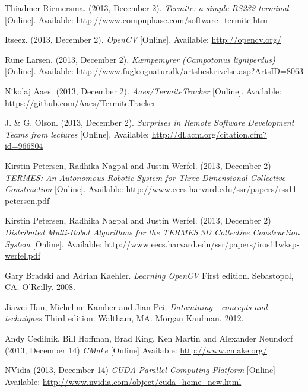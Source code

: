 \documentclass[oribibl]{llncs}
\begin{document}
\begin{thebibliography}{9}
    
		 Thiadmer Riemersma. (2013, December 2). \textit{Termite: a simple RS232 terminal} [Online]. Available: \url{http://www.compuphase.com/software_termite.htm}
        
         Itseez. (2013, December 2). \textit{OpenCV} [Online]. Available: \url{http://opencv.org/}
        
         Rune Larsen. (2013, December 2). \textit{Kæmpemyrer (Campotonus ligniperdus)} [Online]. Available: \url{http://www.fugleognatur.dk/artsbeskrivelse.asp?ArtsID=8063}
        
         Nikolaj Aaes. (2013, December 2). \textit{Aaes/TermiteTracker} [Online]. Available: \url{https://github.com/Aaes/TermiteTracker}
        
		 J. \& G. Olson. (2013, December 2). \textit{Surprises in Remote Software Development Teams from lectures} [Online]. Available: \url{http://dl.acm.org/citation.cfm?id=966804}
        
         Kirstin Petersen, Radhika Nagpal and Justin Werfel. (2013, December 2) \textit{TERMES: An Autonomous Robotic System for Three-Dimensional Collective Construction} [Online]. Available: \url{http://www.eecs.harvard.edu/ssr/papers/rss11-petersen.pdf}
        
         Kirstin Petersen, Radhika Nagpal and Justin Werfel. (2013, December 2) \textit{Distributed Multi-Robot Algorithms for the TERMES 3D Collective Construction System} [Online]. Available: \url{http://www.eecs.harvard.edu/ssr/papers/iros11wksp-werfel.pdf}
        
         Gary Bradski and Adrian Kaehler. \textit{Learning OpenCV} First edition. Sebastopol, CA. O'Reilly. 2008.
        
         Jiawei Han, Micheline Kamber and Jian Pei. \textit{Datamining - concepts and techniques} Third edition. Waltham, MA. Morgan Kaufman. 2012.
        
         Andy Cedilnik, Bill Hoffman, Brad King, Ken Martin and Alexander Neundorf (2013, December 14) \textit{CMake} [Online] Available: \url{http://www.cmake.org/}
        
         NVidia (2013, December 14) \textit{CUDA Parallel Computing Platform } [Online] Available: \url{http://www.nvidia.com/object/cuda_home_new.html}
        
\end{thebibliography}

%
\end{document}

